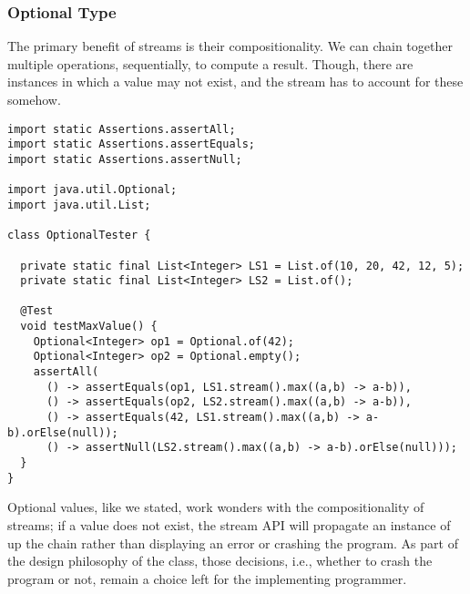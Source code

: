 \subsubsection*{Optional Type}
The primary benefit of streams is their compositionality. We can chain together multiple operations, sequentially, to compute a result. Though, there are instances in which a value may not exist, and the stream has to account for these somehow.


\begin{lstlisting}[language=MyJava]
import static Assertions.assertAll;
import static Assertions.assertEquals;
import static Assertions.assertNull;

import java.util.Optional;
import java.util.List;

class OptionalTester {

  private static final List<Integer> LS1 = List.of(10, 20, 42, 12, 5);
  private static final List<Integer> LS2 = List.of();

  @Test
  void testMaxValue() {
    Optional<Integer> op1 = Optional.of(42);
    Optional<Integer> op2 = Optional.empty();
    assertAll(
      () -> assertEquals(op1, LS1.stream().max((a,b) -> a-b)),
      () -> assertEquals(op2, LS2.stream().max((a,b) -> a-b)),
      () -> assertEquals(42, LS1.stream().max((a,b) -> a-b).orElse(null));
      () -> assertNull(LS2.stream().max((a,b) -> a-b).orElse(null)));
  }
}
\end{lstlisting}

Optional values, like we stated, work wonders with the compositionality of streams; if a value does not exist, the stream API will propagate an  instance of  up the chain rather than displaying an error or crashing the program. As part of the design philosophy of the class, those decisions, i.e., whether to crash the program or not, remain a choice left for the implementing programmer.
